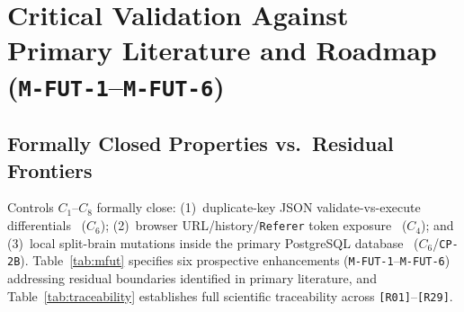 \documentclass[10pt,twocolumn]{article}
\begin{document}
\section{Critical Validation Against Primary Literature and Roadmap (\texttt{M-FUT-1}--\texttt{M-FUT-6})}

\subsection{Formally Closed Properties vs.\ Residual Frontiers}

Controls $C_1$--$C_8$ formally close: (1)~duplicate-key JSON validate-vs-execute differentials~\cite{R11,R12,R17,R19} ($C_6$); (2)~browser URL/history/\texttt{Referer} token exposure~\cite{R28} ($C_4$); and (3)~local split-brain mutations inside the primary PostgreSQL database~\cite{R13} ($C_6$/\texttt{CP-2B}). Table~\ref{tab:mfut} specifies six prospective enhancements (\texttt{M-FUT-1}--\texttt{M-FUT-6}) addressing residual boundaries identified in primary literature, and Table~\ref{tab:traceability} establishes full scientific traceability across \texttt{[R01]}--\texttt{[R29]}.
\end{document}
